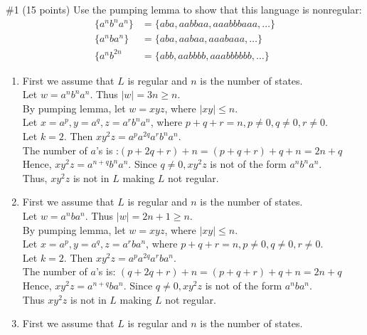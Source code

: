 \begin{problem}{\#1 (15 points)}
    Use the pumping lemma to show that this language is nonregular:
    \begin{align*}
        \{a^nb^na^n\} &= \{aba,aabbaa,aaabbbaaa,\ldots\}\\
        \{a^nba^n\} &= \{aba,aabaa,aaabaaa,\ldots\}\\
        \{a^nb^{2n} &= \{abb,aabbbb,aaabbbbbb,\ldots\}
    \end{align*}
\end{problem}
\begin{solution}
    \begin{enumerate}
        \item First we assume that $L$ is regular and $n$ is the number of states.\\
        Let $w = a^nb^na^n$. Thus $|w| = 3n \geq n$.\\
        By pumping lemma, let $w = xyz$, where $|xy|\leq n$.\\
        Let $x=a^p,y=a^q,z=a^rb^na^n$, where $p+q+r=n, p\neq 0, q \neq 0, r\neq 0$.\\
        Let $k=2$. Then $xy^2z=a^pa^{2q}a^rb^na^n$.\\
        The number of $a$'s is :$\left( p+2q+r \right)+n=\left( p+q+r \right)+q+n = 2n+q$\\
        Hence, $xy^2z=a^{n+q}b^na^n$. Since $q\neq 0, xy^2z$ is not of the form $a^nb^na^n$.\\
        Thus, $xy^2z$ is not in $L$ making $L$ not regular.
        \item First we assume that $L$ is regular and $n$ is the number of states.\\
        Let $w = a^nba^n$. Thus $|w| = 2n+1 \geq n$.\\
        By pumping lemma, let $w=xyz$, where $|xy|\leq n$.\\
        Let $x=a^p,y=a^q,z=a^rba^n$, where $p+q+r=n,p\neq 0,q\neq 0, r\neq 0$.\\
        Let $k=2$. Then $xy^2z=a^pa^{2q}a^rba^n$.\\
        The number of $a$'s is: $\left( q+2q+r \right)+n=\left( p+q+r \right)+q+n = 2n+q$\\
        Hence, $xy^2z=a^{n+q}ba^n$. Since $q\neq 0, xy^2z$ is not of the form $a^nba^n$.\\
        Thus $xy^2z$ is not in $L$ making $L$ not regular. 
        \item First we assume that $L$ is regular and $n$ is the number of states.\\

\end{enumerate}
\end{solution}
